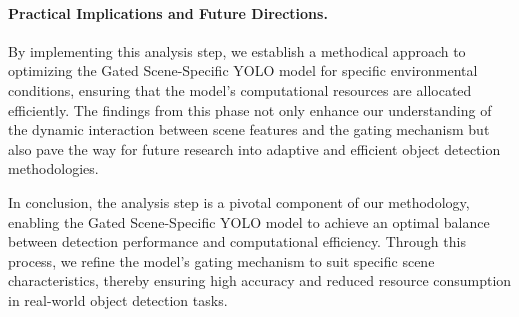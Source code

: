 \paragraph{Practical Implications and Future Directions.} By implementing this analysis step, we establish a methodical approach to optimizing the Gated Scene-Specific YOLO model for specific environmental conditions, ensuring that the model's computational resources are allocated efficiently. The findings from this phase not only enhance our understanding of the dynamic interaction between scene features and the gating mechanism but also pave the way for future research into adaptive and efficient object detection methodologies.

In conclusion, the analysis step is a pivotal component of our methodology, enabling the Gated Scene-Specific YOLO model to achieve an optimal balance between detection performance and computational efficiency. Through this process, we refine the model's gating mechanism to suit specific scene characteristics, thereby ensuring high accuracy and reduced resource consumption in real-world object detection tasks.

\clearpage
